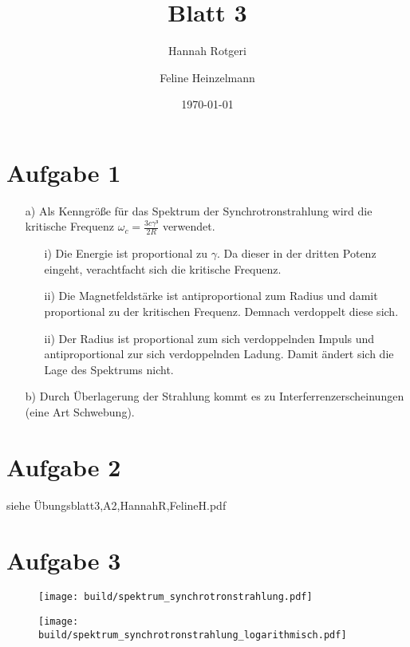 \documentclass[11pt,a4paper]{article}
\title{Blatt 3}
\date{\today}
\author{Hannah Rotgeri \and Feline Heinzelmann}
\begin{document}
    \maketitle

    \section*{Aufgabe 1}

    \begin{enumerate}
        \item[a)] Als Kenngröße für das Spektrum der Synchrotronstrahlung wird die kritische Frequenz $\omega_c = \frac{3c\gamma³}{2R}$ verwendet.
         \begin{itemize}
             \item[i)] Die Energie ist proportional zu $\gamma$. Da dieser in der dritten Potenz eingeht, verachtfacht sich die kritische Frequenz.
             \item[ii)] Die Magnetfeldstärke ist antiproportional zum Radius und damit proportional zu der kritischen Frequenz. Demnach verdoppelt diese sich.
             \item[ii)] Der Radius ist proportional zum sich verdoppelnden Impuls und antiproportional zur sich verdoppelnden Ladung. Damit ändert sich die Lage des Spektrums nicht.
         \end{itemize}    
        \item[b)] Durch Überlagerung der Strahlung kommt es zu Interferrenzerscheinungen (eine Art Schwebung).
		
	\end{enumerate}
	
    \section*{Aufgabe 2}
	
        siehe Übungsblatt3,A2,HannahR,FelineH.pdf
        

    \section*{Aufgabe 3}

    \begin{figure}[h]
        \centering
        \texttt{[image: build/spektrum\_synchrotronstrahlung.pdf]}
    \end{figure}

    \begin{figure}[h]
        \centering
        \texttt{[image: build/spektrum\_synchrotronstrahlung\_logarithmisch.pdf]}
    \end{figure}
\end{document}
